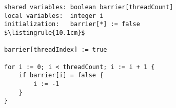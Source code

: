 \begin{center}
\begin{minipage}{\textwidth}
\begin{lstlisting}[mathescape, linewidth=10.1cm]
shared variables: boolean barrier[threadCount]
local variables:  integer i
initialization:   barrier[*] := false
$\listingrule{10.1cm}$

barrier[threadIndex] := true

for i := 0; i < threadCount; i := i + 1 {
	if barrier[i] = false {
		i := -1
	}
}
\end{lstlisting}
\end{minipage}
\end{center}
